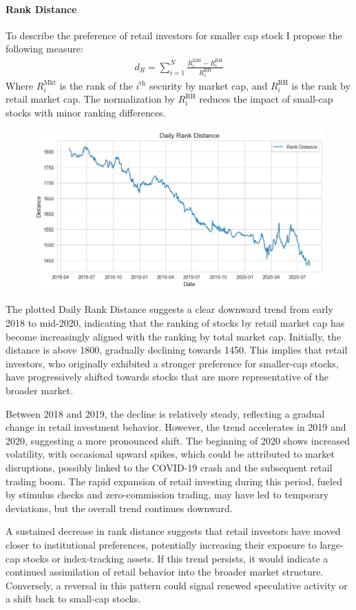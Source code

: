 \paragraph{Rank Distance} 
To describe the preference of retail investors for smaller cap stock I propose the following measure:
\begin{align*}
    d_R = \sum_{i=1}^N \frac{R^{\text{Mkt}}_i-R^{\text{RH}}_i}{R^{\text{RH}}_i}
\end{align*}
Where $R^{\text{Mkt}}_i$ is the rank of the $i^\text{th}$ security by market cap, and $R^{\text{RH}}_i$ is the rank by retail market cap. The normalization by $R^{\text{RH}}_i$ reduces the impact of small-cap stocks with minor ranking differences.

\begin{figure}[h]
        \centering
        \includegraphics[width=0.8\linewidth]{Images/rank_distance.png}
\end{figure}

The plotted Daily Rank Distance suggests a clear downward trend from early 2018 to mid-2020, indicating that the ranking of stocks by retail market cap has become increasingly aligned with the ranking by total market cap. Initially, the distance is above 1800, gradually declining towards 1450. This implies that retail investors, who originally exhibited a stronger preference for smaller-cap stocks, have progressively shifted towards stocks that are more representative of the broader market.

Between 2018 and 2019, the decline is relatively steady, reflecting a gradual change in retail investment behavior. However, the trend accelerates in 2019 and 2020, suggesting a more pronounced shift. The beginning of 2020 shows increased volatility, with occasional upward spikes, which could be attributed to market disruptions, possibly linked to the COVID-19 crash and the subsequent retail trading boom. The rapid expansion of retail investing during this period, fueled by stimulus checks and zero-commission trading, may have led to temporary deviations, but the overall trend continues downward.

A sustained decrease in rank distance suggests that retail investors have moved closer to institutional preferences, potentially increasing their exposure to large-cap stocks or index-tracking assets. If this trend persists, it would indicate a continued assimilation of retail behavior into the broader market structure. Conversely, a reversal in this pattern could signal renewed speculative activity or a shift back to small-cap stocks.
